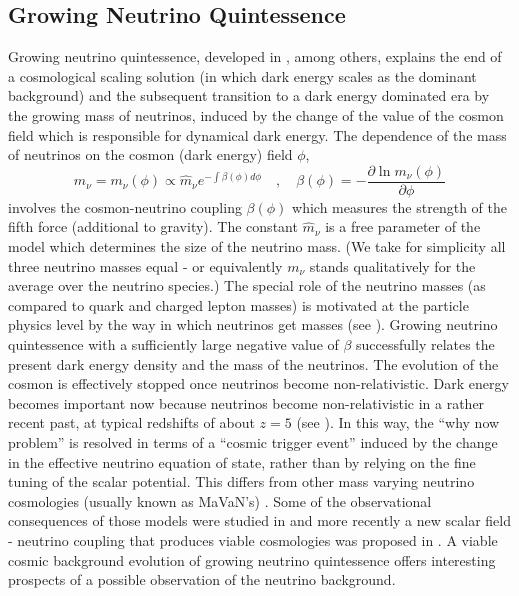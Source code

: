 \subsection{Growing Neutrino Quintessence \label{sub:GNQ}}

Growing neutrino quintessence, developed in \cite{amendola_growing_2008,wetterich_growing_2007}, among others,
explains the end of a cosmological scaling solution (in which dark
energy scales as the dominant background) and the subsequent transition
to a dark energy dominated era by the growing mass of neutrinos, induced
by the change of the value of the cosmon field which is responsible
for dynamical dark energy. 
The dependence of the mass of neutrinos
on the cosmon (dark energy) field $\phi$, 
\begin{equation}
m_{\nu}=m_{\nu}(\phi)\propto\hat{m}_{\nu}e^{-\int\beta(\phi)d\phi}\quad,\quad \beta(\phi)=-\frac{\partial\ln m_{\nu}(\phi)}{\partial\phi}\label{eq: mass_def}
\end{equation}
involves the cosmon-neutrino coupling $\beta(\phi)$ which measures
the strength of the fifth force (additional to gravity). The constant
$\hat{m}_{\nu}$ is a free parameter of the model which determines
the size of the neutrino mass. (We take for simplicity all three neutrino
masses equal - or equivalently $m_{\nu}$ stands qualitatively for
the average over the neutrino species.) The special role of the neutrino
masses (as compared to quark and charged lepton masses) is motivated
at the particle physics level by the way in which neutrinos get masses
(see \cite{wetterich_growing_2007}). Growing neutrino quintessence with
a sufficiently large negative value of $\beta$ successfully relates
the present dark energy density and the mass of the neutrinos. The
evolution of the cosmon is effectively stopped once neutrinos become
non-relativistic. Dark energy becomes important now because neutrinos
become non-relativistic in a rather recent past, at typical redshifts
of about $z=5$ (see \cite{mota_neutrino_2008}). In this way, the ``why
now problem'' is resolved in terms of a ``cosmic trigger event''
induced by the change in the effective neutrino equation of state,
rather than by relying on the fine tuning of the scalar potential.
This differs from other mass varying neutrino cosmologies (usually
known as MaVaN's) \cite{brookfield_cosmology_2007,la_vacca_mass-varying_2013,bi_cosmological_2005,fardon_dark_2004,kaplan_neutrino_2004,spitzer_stability_2006,takahashi_speed_2006}.
Some of the observational consequences of those models were studied
in \cite{la_vacca_mass-varying_2013,kaplan_neutrino_2004} and more
recently a new scalar field - neutrino coupling that produces viable
cosmologies was proposed in \cite{simpson_dark_2016}. A viable cosmic
background evolution of growing neutrino quintessence offers interesting
prospects of a possible observation of the neutrino background.

